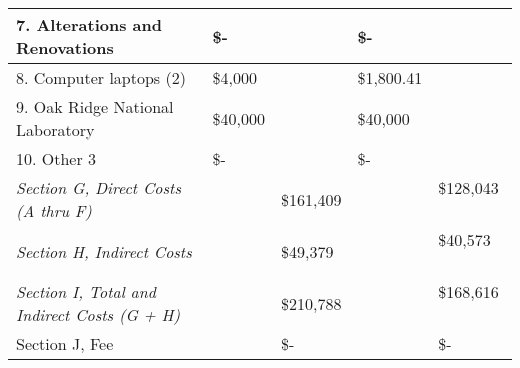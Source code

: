 \documentclass[12pt]{article}
\begin{document}
\begin{tabular}{ | l | l | l | l | l | }
	7.  Alterations and Renovations &  \$-  & \  &  \$-      & \  \\ \hline
	8.  Computer laptops (2) & \$4,000  & & \$1,800.41  & \  \\ \hline
	9. Oak Ridge National Laboratory &  \$40,000 &  &  \$40,000    & \  \\ \hline
	10. Other 3 &  \$-    & \ &  \$-      & \  \\ \hline
	\textit{Section G, Direct Costs (A thru F)} &  & \$161,409 & & \$128,043  \  \\ \hline
	\textit{Section H, Indirect Costs} &  & \$49,379 & & \$40,573 \  \\ \hline
	\textit{Section I, Total and Indirect Costs (G + H)} & &  \$210,788 &  &  \$168,616 \  \\ \hline
	Section J, Fee & \ &  \$-   & \ &  \$-       \\ \hline
\end{tabular}
\end{document}
